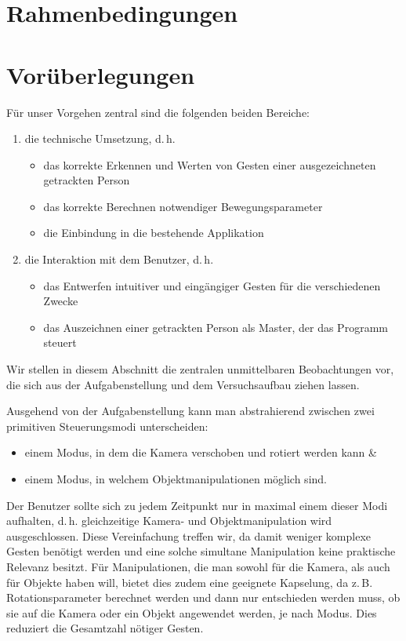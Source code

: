 \documentclass[12pt,a4paper]{article}
\title{\Title}
\author{
	Mario Janke\\
	Peter Lindner\\
	Patrick Stäblein}
\date{}
\begin{document}
\maketitle
\tableofcontents
\clearpage
\section{Rahmenbedingungen}
	
	
\section{Vorüberlegungen}

	Für unser Vorgehen zentral sind die folgenden beiden Bereiche:
	\begin{enumerate}
		\item die technische Umsetzung, d.\,h.
		\begin{itemize}
		\item das korrekte Erkennen und Werten von Gesten einer ausgezeichneten getrackten Person
		\item das korrekte Berechnen notwendiger Bewegungsparameter
		\item die Einbindung in die bestehende Applikation
		\end{itemize}
		\item die Interaktion mit dem Benutzer, d.\,h.
		\begin{itemize}
		\item das Entwerfen intuitiver und eingängiger Gesten für die verschiedenen Zwecke
		\item das Auszeichnen einer getrackten Person als \glqq Master\grqq, der das Programm steuert
		\end{itemize}
	\end{enumerate}
	Wir stellen in diesem Abschnitt die zentralen unmittelbaren Beobachtungen vor, die sich aus der Aufgabenstellung und dem Versuchsaufbau ziehen lassen.\par\bigskip
	Ausgehend von der Aufgabenstellung kann man abstrahierend zwischen zwei primitiven Steuerungsmodi unterscheiden:
	\begin{itemize}
	\item einem Modus, in dem die Kamera verschoben und rotiert werden kann \&
	\item einem Modus, in welchem Objektmanipulationen möglich sind.
	\end{itemize}
	Der Benutzer sollte sich zu jedem Zeitpunkt nur in maximal einem dieser Modi aufhalten, d.\,h. gleichzeitige Kamera- und Objektmanipulation wird ausgeschlossen. Diese Vereinfachung treffen wir, da damit weniger komplexe Gesten benötigt werden und eine solche simultane Manipulation keine praktische Relevanz besitzt. Für Manipulationen, die man sowohl für die Kamera, als auch für Objekte haben will, bietet dies zudem eine geeignete Kapselung, da z.\,B. Rotationsparameter berechnet werden und dann nur entschieden werden muss, ob sie auf die Kamera oder ein Objekt angewendet werden, je nach Modus. Dies reduziert die Gesamtzahl nötiger Gesten.\par\medskip
\end{document}
